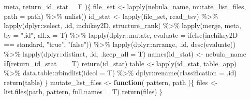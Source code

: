 \documentclass[
]{article}
\newenvironment{Shaded}{\begin{snugshade}}{\end{snugshade}}
\newcommand{\AttributeTok}[1]{\textcolor[rgb]{0.77,0.63,0.00}{#1}}
\newcommand{\ControlFlowTok}[1]{\textcolor[rgb]{0.13,0.29,0.53}{\textbf{#1}}}
\newcommand{\FunctionTok}[1]{\textcolor[rgb]{0.00,0.00,0.00}{#1}}
\newcommand{\NormalTok}[1]{#1}
\newcommand{\OtherTok}[1]{\textcolor[rgb]{0.56,0.35,0.01}{#1}}
\newcommand{\SpecialCharTok}[1]{\textcolor[rgb]{0.00,0.00,0.00}{#1}}
\newcommand{\StringTok}[1]{\textcolor[rgb]{0.31,0.60,0.02}{#1}}
\begin{document}
\begin{Shaded}
\begin{Highlighting}[]
\NormalTok{           meta,}
           \AttributeTok{return\_id\_stat =}\NormalTok{ F}
\NormalTok{           )\{}
\NormalTok{    file\_set }\OtherTok{\textless{}{-}} \FunctionTok{lapply}\NormalTok{(nebula\_name, mutate\_list\_files, }\AttributeTok{path =}\NormalTok{ path) }\SpecialCharTok{\%\textgreater{}\%} 
      \FunctionTok{unlist}\NormalTok{()}
\NormalTok{    id\_stat }\OtherTok{\textless{}{-}} \FunctionTok{lapply}\NormalTok{(file\_set, read\_tsv) }\SpecialCharTok{\%\textgreater{}\%} 
      \FunctionTok{lapply}\NormalTok{(dplyr}\SpecialCharTok{::}\NormalTok{select, .id, inchikey2D, structure\_rank) }\SpecialCharTok{\%\textgreater{}\%} 
      \FunctionTok{lapply}\NormalTok{(merge, meta, }\AttributeTok{by =} \StringTok{".id"}\NormalTok{, }\AttributeTok{all.x =}\NormalTok{ T) }\SpecialCharTok{\%\textgreater{}\%} 
      \FunctionTok{lapply}\NormalTok{(dplyr}\SpecialCharTok{::}\NormalTok{mutate, }\AttributeTok{evaluate =} \FunctionTok{ifelse}\NormalTok{(inchikey2D }\SpecialCharTok{==}\NormalTok{ standard, }\StringTok{"true"}\NormalTok{, }\StringTok{"false"}\NormalTok{)) }\SpecialCharTok{\%\textgreater{}\%} 
      \FunctionTok{lapply}\NormalTok{(dplyr}\SpecialCharTok{::}\NormalTok{arrange, .id, }\FunctionTok{desc}\NormalTok{(evaluate)) }\SpecialCharTok{\%\textgreater{}\%} 
      \FunctionTok{lapply}\NormalTok{(dplyr}\SpecialCharTok{::}\NormalTok{distinct, .id, }\AttributeTok{.keep\_all =}\NormalTok{ T)}
    \FunctionTok{names}\NormalTok{(id\_stat) }\OtherTok{\textless{}{-}}\NormalTok{ nebula\_name}
    \ControlFlowTok{if}\NormalTok{(return\_id\_stat }\SpecialCharTok{==}\NormalTok{ T)}
      \FunctionTok{return}\NormalTok{(id\_stat)}
\NormalTok{    table }\OtherTok{\textless{}{-}} \FunctionTok{lapply}\NormalTok{(id\_stat, table\_app) }\SpecialCharTok{\%\textgreater{}\%}
\NormalTok{      data.table}\SpecialCharTok{::}\FunctionTok{rbindlist}\NormalTok{(}\AttributeTok{idcol =}\NormalTok{ T) }\SpecialCharTok{\%\textgreater{}\%}
\NormalTok{      dplyr}\SpecialCharTok{::}\FunctionTok{rename}\NormalTok{(}\AttributeTok{classification =}\NormalTok{ .id)}
    \FunctionTok{return}\NormalTok{(table)}
\NormalTok{  \}}
\NormalTok{mutate\_list\_files }\OtherTok{\textless{}{-}} 
  \ControlFlowTok{function}\NormalTok{(}
\NormalTok{           pattern,}
\NormalTok{           path}
\NormalTok{           )\{}
\NormalTok{    files }\OtherTok{\textless{}{-}} \FunctionTok{list.files}\NormalTok{(path, pattern, }\AttributeTok{full.names =}\NormalTok{ T)}
    \FunctionTok{return}\NormalTok{(files)}
\NormalTok{  \}}
\end{Highlighting}
\end{Shaded}
\end{document}
